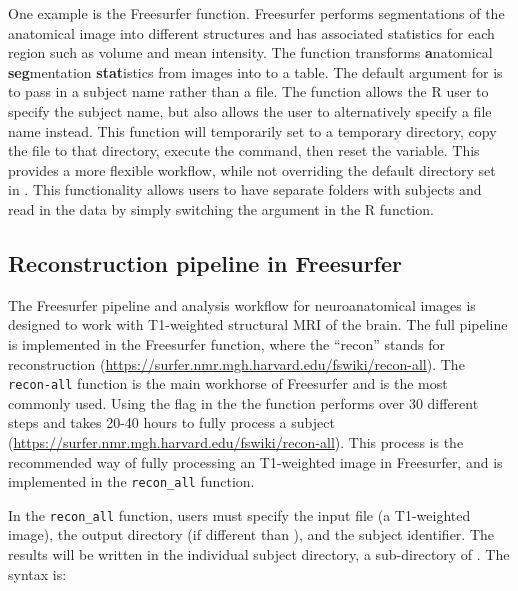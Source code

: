 One example is the  Freesurfer function.
Freesurfer performs segmentations of the anatomical image into different
structures and has associated statistics for each region such as volume
and mean intensity. The  function transforms
\textbf{a}natomical \textbf{seg}mentation \textbf{stat}istics from
images into to a table. The default argument for 
is to pass in a subject name rather than a file. The 
 function allows the R user to specify the subject
name, but also allows the user to alternatively specify a file name
instead. This function will temporarily set  to a
temporary directory, copy the file to that directory, execute the
command, then reset the  variable. This provides a
more flexible workflow, while not overriding the default directory set
in . This functionality allows users to have
separate folders with subjects and read in the data by simply switching
the  argument in the R function.

\subsection{Reconstruction pipeline in
Freesurfer}\label{reconstruction-pipeline-in-freesurfer}

The Freesurfer pipeline and analysis workflow for neuroanatomical images
is designed to work with T1-weighted structural MRI of the brain. The
full pipeline is implemented in the Freesurfer 
function, where the ``recon'' stands for reconstruction
(\url{https://surfer.nmr.mgh.harvard.edu/fswiki/recon-all}). The
\texttt{recon-all} function is the main workhorse of Freesurfer and is
the most commonly used. Using the  flag in the the
 function performs over 30 different steps and takes
20-40 hours to fully process a subject
(\url{https://surfer.nmr.mgh.harvard.edu/fswiki/recon-all}). This
process is the recommended way of fully processing an T1-weighted image
in Freesurfer, and is implemented in the \texttt{recon\_all}
 function.

In the \texttt{recon\_all} function, users must specify the input file
(a T1-weighted image), the output directory (if different than
), and the subject identifier. The results will be
written in the individual subject directory, a sub-directory of
. The syntax is:

